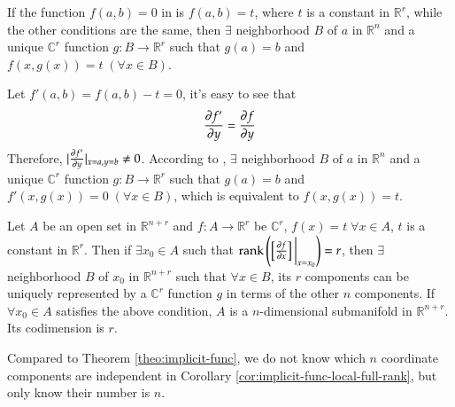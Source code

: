 \documentclass[11pt, a4paper]{book}
\begin{document}
\begin{Corollary}
  If the function $f(a, b) = 0$ in  is $f(a, b) = t$,
  where $t$ is a constant in $\mathbb{R}^r$, while the other conditions are the
  same, then $\exists$ neighborhood $B$ of $a$ in $\mathbb{R}^n$ and a unique
  $\mathbb{C}^r$ function $g: B \rightarrow \mathbb{R}^r$ such that $g(a) = b$
  and $f(x, g(x)) = t \; (\forall x \in B)$.
\end{Corollary}

\begin{Proof}
  Let $f'(a, b) = f(a, b) - t = 0$, it's easy to see that
  $$
  \frac{\partial f'}{\partial y} = \frac{\partial f}{\partial y}
  $$
  Therefore, $\lvert\frac{\partial f'}{\partial y}\rvert_{x=a, y=b} \neq 0$. According to
  , $\exists$ neighborhood $B$ of $a$ in
  $\mathbb{R}^n$ and a unique $\mathbb{C}^r$ function $g: B \rightarrow
  \mathbb{R}^r$ such that $g(a) = b$ and $f'(x, g(x)) = 0 \; (\forall x \in B)$,
  which is equivalent to $f(x, g(x)) = t$.
\end{Proof}

\begin{Corollary}
  \label{cor:implicit-func-local-full-rank}
  Let $A$ be an open set in $\mathbb{R}^{n+r}$ and $f: A \rightarrow \mathbb{R}^r$ be
  $\mathbb{C}^r$, $f(x) = t \; \forall x \in A$, $t$ is a constant in $\mathbb{R}^r$. Then
  if $\exists x_0 \in A$ such that
  $\operatorname{rank}\left( \left[ \frac{\partial f}{\partial x} \right] \bigg\vert_{x=x_0} \right)=r$,
  then $\exists$ neighborhood $B$ of $x_0$ in $\mathbb{R}^{n+r}$ such that
  $\forall x \in B$, its $r$ components can be uniquely represented by a $\mathbb{C}^r$
  function $g$ in terms of the other $n$ components. If $\forall x_0 \in A$ satisfies the
  above condition, $A$ is a $n$-dimensional submanifold in $\mathbb{R}^{n+r}$. Its
  codimension is $r$.
\end{Corollary}

\begin{Remark}
  Compared to Theorem \ref{theo:implicit-func}, we do not know which $n$ coordinate
  components are independent in Corollary \ref{cor:implicit-func-local-full-rank}, but
  only know their number is $n$.
\end{Remark}
\end{document}
